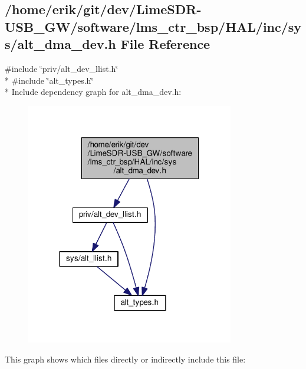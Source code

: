 \subsection{/home/erik/git/dev/\+Lime\+S\+D\+R-\/\+U\+S\+B\+\_\+\+G\+W/software/lms\+\_\+ctr\+\_\+bsp/\+H\+A\+L/inc/sys/alt\+\_\+dma\+\_\+dev.h File Reference}
\label{alt__dma__dev_8h}
{\ttfamily \#include \char`\"{}priv/alt\+\_\+dev\+\_\+llist.\+h\char`\"{}}\\*
{\ttfamily \#include \char`\"{}alt\+\_\+types.\+h\char`\"{}}\\*
Include dependency graph for alt\+\_\+dma\+\_\+dev.\+h\+:
\nopagebreak
\begin{figure}[H]
\begin{center}
\leavevmode
\includegraphics[width=257pt]{d8/dd8/alt__dma__dev_8h__incl}
\end{center}
\end{figure}
This graph shows which files directly or indirectly include this file\+:
\nopagebreak
